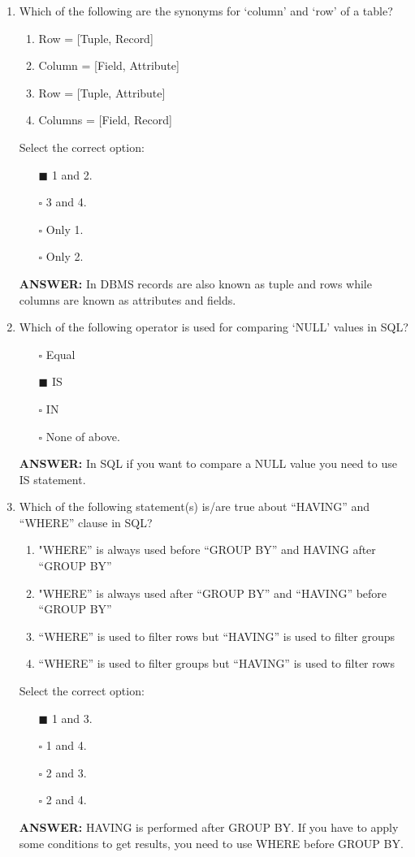 \documentclass[10pt]{article}
\begin{document}
\begin{enumerate}
		\item Which of the following are the synonyms for ‘column’ and ‘row’ of a table?
			\begin{enumerate}
				\item Row = [Tuple, Record]
				\item Column = [Field, Attribute]
				\item Row = [Tuple, Attribute]
				\item Columns = [Field, Record]
			\end{enumerate}
			Select the correct option:
			\begin{enumerate}
				\item[$\blacksquare$] 1 and 2.
				\item[$\square$] 3 and 4.
				\item[$\square$] Only 1.
				\item[$\square$] Only 2.
			\end{enumerate}
			\color{red} \textbf{ANSWER:} \color{black} In DBMS records are also known as tuple and rows while columns are known as attributes and fields.

		\item Which of the following operator is used for comparing ‘NULL’ values in SQL?
			\begin{enumerate}
				\item[$\square$] Equal
				\item[$\blacksquare$] IS
				\item[$\square$] IN
				\item[$\square$] None of above.
			\end{enumerate}
			\color{red} \textbf{ANSWER:} \color{black} In SQL if you want to compare a NULL value you need to use IS statement.

		\newpage

		\item Which of the following statement(s) is/are true about “HAVING” and “WHERE” clause in SQL?
			\begin{enumerate}
				\item "WHERE” is always used before “GROUP BY” and HAVING after “GROUP BY”
				\item "WHERE” is always used after “GROUP BY” and “HAVING” before “GROUP BY”
				\item “WHERE” is used to filter rows but “HAVING” is used to filter groups
				\item “WHERE” is used to filter groups but “HAVING” is used to filter rows
			\end{enumerate}
			Select the correct option:
			\begin{enumerate}
				\item[$\blacksquare$] 1 and 3.
				\item[$\square$] 1 and 4.
				\item[$\square$] 2 and 3.
				\item[$\square$] 2 and 4.
			\end{enumerate}
			\color{red} \textbf{ANSWER:} \color{black} HAVING is performed after GROUP BY. If you have to apply some conditions to get results, you need to use WHERE before GROUP BY.


\end{enumerate}
\end{document}
